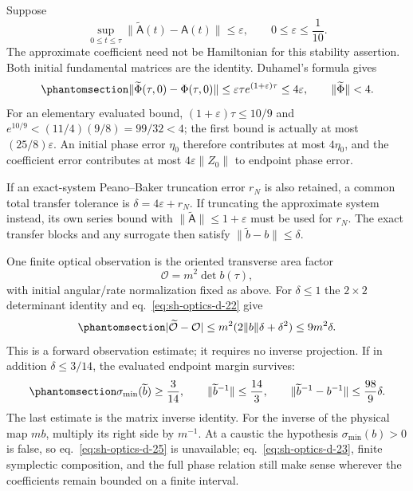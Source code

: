 \documentclass[
  english,
  11pt,
  reqno]{amsart}
\begin{document}
Suppose \[
 \sup_{0\le t\le\tau}\|\widetilde{\mathsf A}(t)-\mathsf A(t)\|
 \le\varepsilon,\qquad 0\le\varepsilon\le\frac1{10}.
\] The approximate coefficient need not be Hamiltonian for this
stability assertion. Both initial fundamental matrices are the identity.
Duhamel's formula gives
\begin{equation}\protect\phantomsection\label{eq:sh-optics-d-23}{
 \|\widetilde\Phi(\tau,0)-\Phi(\tau,0)\|
 \le\varepsilon\tau e^{(1+\varepsilon)\tau}\le4\varepsilon,
 \qquad \|\widetilde\Phi\|<4.
}\end{equation} For an elementary evaluated bound,
\((1+\varepsilon)\tau\le10/9\) and \(e^{10/9}<(11/4)(9/8)=99/32<4\); the
first bound is actually at most \((25/8)\varepsilon\). An initial phase
error \(\eta_0\) therefore contributes at most \(4\eta_0\), and the
coefficient error contributes at most \(4\varepsilon\|Z_0\|\) to
endpoint phase error.

If an exact-system Peano--Baker truncation error \(r_N\) is also
retained, a common total transfer tolerance is
\(\delta=4\varepsilon+r_N\). If truncating the approximate system
instead, its own series bound with
\(\|\widetilde{\mathsf A}\|\le1+\varepsilon\) must be used for \(r_N\).
The exact transfer blocks and any surrogate then satisfy
\(\|\widetilde b-b\|\le\delta\).

One finite optical observation is the oriented transverse area factor \[
 \mathcal O=m^2\det b(\tau),
\] with initial angular/rate normalization fixed as above. For
\(\delta\le1\) the \(2\times2\) determinant identity and
eq.~\ref{eq:sh-optics-d-22} give
\begin{equation}\protect\phantomsection\label{eq:sh-optics-d-24}{
 |\widetilde{\mathcal O}-\mathcal O|
 \le m^2(2\|b\|\delta+\delta^2)\le9m^2\delta.
}\end{equation} This is a forward observation estimate; it requires no
inverse projection. If in addition \(\delta\le3/14\), the evaluated
endpoint margin survives:
\begin{equation}\protect\phantomsection\label{eq:sh-optics-d-25}{
 \sigma_{\min}(\widetilde b)\ge\frac3{14},\qquad
 \|\widetilde b^{-1}\|\le\frac{14}{3},\qquad
 \|\widetilde b^{-1}-b^{-1}\|\le\frac{98}{9}\delta.
}\end{equation} The last estimate is the matrix inverse identity. For
the inverse of the physical map \(m b\), multiply its right side by
\(m^{-1}\). At a caustic the hypothesis \(\sigma_{\min}(b)>0\) is false,
so eq.~\ref{eq:sh-optics-d-25} is unavailable;
eq.~\ref{eq:sh-optics-d-23}, finite symplectic composition, and the full
phase relation still make sense wherever the coefficients remain bounded
on a finite interval.
\end{document}
